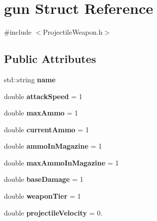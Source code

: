 \hypertarget{structgun}{}\section{gun Struct Reference}
\label{structgun}


{\ttfamily \#include $<$Projectile\+Weapon.\+h$>$}

\subsection*{Public Attributes}
\begin{DoxyCompactItemize}
\item 
\hypertarget{structgun_a7cbcf4a792ca5593eb8d7831746109b6}{}std\+::string {\bfseries name}\label{structgun_a7cbcf4a792ca5593eb8d7831746109b6}

\item 
\hypertarget{structgun_aa7da6470c4361d26dfe7beabfc9cc73f}{}double {\bfseries attack\+Speed} = 1\label{structgun_aa7da6470c4361d26dfe7beabfc9cc73f}

\item 
\hypertarget{structgun_a432779ecf3a4342cbc98a5906d82b799}{}double {\bfseries max\+Ammo} = 1\label{structgun_a432779ecf3a4342cbc98a5906d82b799}

\item 
\hypertarget{structgun_a2078d8b4b720f3e758bf7924e98d3761}{}double {\bfseries current\+Ammo} = 1\label{structgun_a2078d8b4b720f3e758bf7924e98d3761}

\item 
\hypertarget{structgun_ae62ed9a738de436a67dbb241faa4ef89}{}double {\bfseries ammo\+In\+Magazine} = 1\label{structgun_ae62ed9a738de436a67dbb241faa4ef89}

\item 
\hypertarget{structgun_a16b24a4f76b911b25a49a2be3d347391}{}double {\bfseries max\+Ammo\+In\+Magazine} = 1\label{structgun_a16b24a4f76b911b25a49a2be3d347391}

\item 
\hypertarget{structgun_ae0442e3711d757139fe5593ef0dec884}{}double {\bfseries base\+Damage} = 1\label{structgun_ae0442e3711d757139fe5593ef0dec884}

\item 
\hypertarget{structgun_aaca1c9de06ffc4a46b2b9a43aaa36ef9}{}double {\bfseries weapon\+Tier} = 1\label{structgun_aaca1c9de06ffc4a46b2b9a43aaa36ef9}

\item 
\hypertarget{structgun_a3bd843f681b73e366c8b26b88d3a3403}{}double {\bfseries projectile\+Velocity} = 0.\label{structgun_a3bd843f681b73e366c8b26b88d3a3403}


\end{DoxyCompactItemize}
